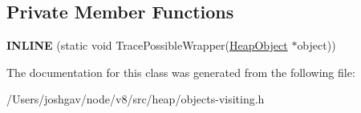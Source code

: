 \subsection*{Private Member Functions}
\begin{DoxyCompactItemize}
\item 
{\bfseries I\+N\+L\+I\+NE} (static void Trace\+Possible\+Wrapper(\hyperlink{classv8_1_1internal_1_1_heap_object}{Heap\+Object} $\ast$object))\hypertarget{classv8_1_1internal_1_1_static_marking_visitor_1_1_j_s_api_object_visitor_aa48f9e1182fd473c4255dfd4d57ace35}{}\label{classv8_1_1internal_1_1_static_marking_visitor_1_1_j_s_api_object_visitor_aa48f9e1182fd473c4255dfd4d57ace35}

\end{DoxyCompactItemize}


The documentation for this class was generated from the following file\+:\begin{DoxyCompactItemize}
\item 
/\+Users/joshgav/node/v8/src/heap/objects-\/visiting.\+h\end{DoxyCompactItemize}
